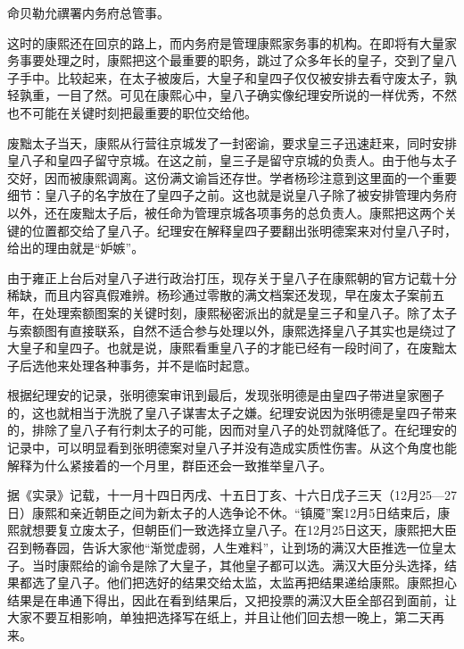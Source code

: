 
\begin{bookquote}命贝勒允禩署内务府总管事。\end{bookquote}


这时的康熙还在回京的路上，而内务府是管理康熙家务事的机构。在即将有大量家务事要处理之时，康熙把这个最重要的职务，跳过了众多年长的皇子，交到了皇八子手中。比较起来，在太子被废后，大皇子和皇四子仅仅被安排去看守废太子，孰轻孰重，一目了然。可见在康熙心中，皇八子确实像纪理安所说的一样优秀，不然也不可能在关键时刻把最重要的职位交给他。



废黜太子当天，康熙从行营往京城发了一封密谕，要求皇三子迅速赶来，同时安排皇八子和皇四子留守京城。在这之前，皇三子是留守京城的负责人。由于他与太子交好，因而被康熙调离。这份满文谕旨还存世。学者杨珍注意到这里面的一个重要细节：皇八子的名字放在了皇四子之前。这也就是说皇八子除了被安排管理内务府以外，还在废黜太子后，被任命为管理京城各项事务的总负责人。康熙把这两个关键的位置都交给了皇八子。纪理安在解释皇四子要翻出张明德案来对付皇八子时，给出的理由就是“妒嫉”。



由于雍正上台后对皇八子进行政治打压，现存关于皇八子在康熙朝的官方记载十分稀缺，而且内容真假难辨。杨珍通过零散的满文档案还发现，早在废太子案前五年，在处理索额图案的关键时刻，康熙秘密派出的就是皇三子和皇八子。除了太子与索额图有直接联系，自然不适合参与处理以外，康熙选择皇八子其实也是绕过了大皇子和皇四子。也就是说，康熙看重皇八子的才能已经有一段时间了，在废黜太子后选他来处理各种事务，并不是临时起意。



根据纪理安的记录，张明德案审讯到最后，发现张明德是由皇四子带进皇家圈子的，这也就相当于洗脱了皇八子谋害太子之嫌。纪理安说因为张明德是皇四子带来的，排除了皇八子有行刺太子的可能，因而对皇八子的处罚就降低了。在纪理安的记录中，可以明显看到张明德案对皇八子并没有造成实质性伤害。从这个角度也能解释为什么紧接着的一个月里，群臣还会一致推举皇八子。



据《实录》记载，十一月十四日丙戌、十五日丁亥、十六日戊子三天（12月25—27日）康熙和亲近朝臣之间为新太子的人选争论不休。“镇魇”案12月5日结束后，康熙就想要复立废太子，但朝臣们一致选择立皇八子。在12月25日这天，康熙把大臣召到畅春园，告诉大家他“渐觉虚弱，人生难料”，让到场的满汉大臣推选一位皇太子。当时康熙给的谕令是除了大皇子，其他皇子都可以选。满汉大臣分头选择，结果都选了皇八子。他们把选好的结果交给太监，太监再把结果递给康熙。康熙担心结果是在串通下得出，因此在看到结果后，又把投票的满汉大臣全部召到面前，让大家不要互相影响，单独把选择写在纸上，并且让他们回去想一晚上，第二天再来。


